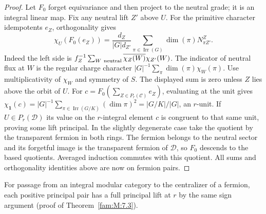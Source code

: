 \documentclass[11pt,a4paper]{article}
\numberwithin{equation}{section}
\theoremstyle{remark}
\newcommand{\one}{\mathbf1}
\begin{document}
\begin{proof}
Let $F_0$ forget equivariance and then project to the neutral grade;
it is an integral linear map. Fix any neutral lift $Z'$ above $U$.
For the primitive character idempotents $e_Z$, orthogonality gives
\[
 \chi_U(F_0(e_Z))=
 \frac{d_Z}{|G|d_{Z'}}
   \sum_{\pi\in\operatorname{Irr}(G)}\dim(\pi) N_{\pi Z'}^Z .
\]
Indeed the left side is $f_Z^{-1}\sum_{W\ {\rm neutral}}
\overline{\chi_Z(W)}\chi_{Z'}(W)$. The indicator of neutral flux
at $W$ is the regular charge character
$|G|^{-1}\sum_\pi\dim(\pi)\chi_W(\pi)$.
Use multiplicativity of $\chi_W$ and symmetry of $S$.
The displayed sum is zero unless $Z$ lies above the orbit of $U$.
For $c=F_0(\sum_{Z\in P_r(\mathcal C)}e_Z)$, evaluating at the
unit gives $\chi_\one(c)=|G|^{-1}\sum_{\pi\in\operatorname{Irr}(G/K)}
(\dim\pi)^2=|G/K|/|G|$, an $r$-unit. If
$U\in P_r(\mathcal D)$ its value on the $r$-integral element $c$
is congruent to that same unit, proving some lift principal.
In the slightly degenerate case take the quotient by the transparent
fermion in both rings. The fermion belongs to the neutral sector
and its forgetful image is the transparent fermion of $\mathcal D$,
so $F_0$ descends to the based quotients. Averaged induction commutes
with this quotient. All sums and orthogonality identities above are
now on fermion pairs.
\end{proof}

For passage from an integral modular category to the centralizer of a
fermion, each positive principal pair has a full principal lift at $r$
by the same sign argument (proof of Theorem~\ref{fam:M:7.3}).
\end{document}
